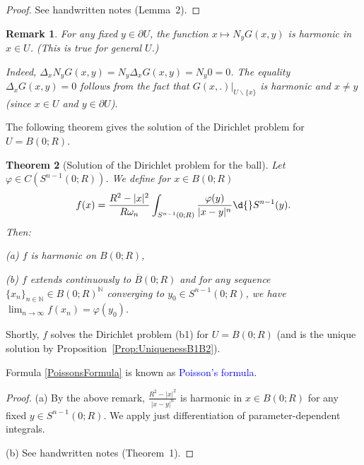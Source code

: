 \documentclass[12pt, oneside, a4paper]{article}
\newtheorem{thm}{Theorem}[section]
\theoremstyle{dfn}
\newtheorem{rem}[thm]{Remark}
\def\Nbb{\mathbb{N}}
\providecommand{\abs}[1]{\lvert#1\rvert}
\begin{document}
\begin{proof}
See handwritten notes (Lemma~2).
\end{proof}

\begin{rem}
For any fixed $y \in \partial U$, the function $x \mapsto N_y G(x,y)$ is harmonic in $x \in U$. (This is true for general $U$.)

Indeed, $\Delta_x N_y G(x,y) = N_y \Delta_x G(x,y) = N_y 0 = 0$. The equality $\Delta_x G(x,y) = 0$ follows from the fact that $G(x,.)|_{U \smallsetminus \{ x \}}$ is harmonic and $x \neq y$ (since $x \in U$ and $y \in \partial U$).
\end{rem}

The following theorem gives the solution of the Dirichlet problem for $U = B(0;R)$.

\begin{thm}[Solution of the Dirichlet problem for the ball]\label{Theo:SolDirichletOverBall}
Let $\varphi \in C(S^{n-1}(0;R))$. We define for $x \in B(0;R)$
\begin{equation}\label{PoissonsFormula}
f(x) = \frac{R^2 - \abs{x}^2}{R \omega_n}
\int_{S^{n-1}(0;R)} \frac{\varphi(y)}{\abs{x-y}^n} \d{}S^{n-1}(y).
\end{equation}
Then:

(a) $f$ is harmonic on $B(0;R)$,

(b) $f$ extends continuously to $\overline{B}(0;R)$ and for any sequence $\{x_n\}_{n \in \Nbb} \in B(0;R)^\Nbb$ converging to $y_0 \in S^{n-1}(0;R)$, we have $\lim_{n \to \infty} f(x_n) = \varphi(y_0)$.
\end{thm}

Shortly, $f$ solves the Dirichlet problem (b1) for $U = B(0;R)$ (and is the unique solution by Proposition~\ref{Prop:UniquenessB1B2}).

Formula \eqref{PoissonsFormula} is known as \textcolor{blue}{Poisson's formula}.

\begin{proof}
(a) By the above remark, $\frac{R^2 - \abs{x}^2}{\abs{x-y}^n}$ is harmonic in $x \in B(0;R)$ for any fixed $y \in S^{n-1}(0;R)$. We apply just differentiation of parameter-dependent integrals.

(b) See handwritten notes (Theorem~1). %
\end{proof}
\end{document}
